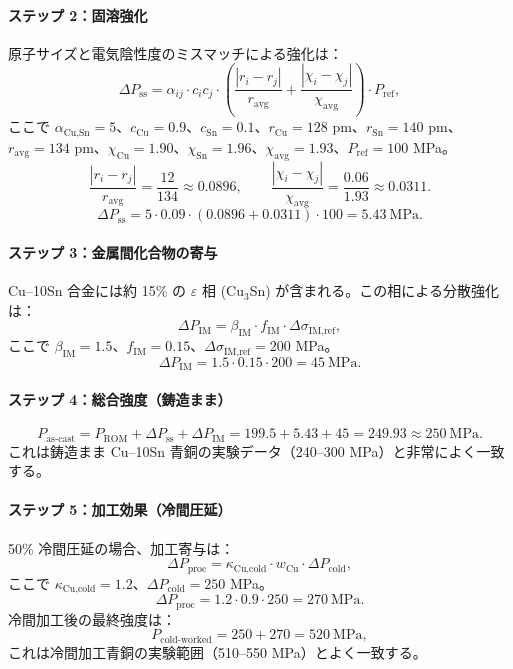 \documentclass[11pt,a4paper]{article}
\theoremstyle{remark}
\begin{document}
	\paragraph{ステップ 2：固溶強化}
	原子サイズと電気陰性度のミスマッチによる強化は：
	\[
	\Delta P_{\text{ss}} = \alpha_{ij} \cdot c_i c_j \cdot \left( \frac{|r_i - r_j|}{r_{\text{avg}}} + \frac{|\chi_i - \chi_j|}{\chi_{\text{avg}}} \right) \cdot P_{\text{ref}},
	\]
	ここで \(\alpha_{\text{Cu,Sn}} = 5\)、\(c_{\text{Cu}}=0.9\)、\(c_{\text{Sn}}=0.1\)、\(r_{\text{Cu}}=128\) pm、\(r_{\text{Sn}}=140\) pm、\(r_{\text{avg}}=134\) pm、\(\chi_{\text{Cu}}=1.90\)、\(\chi_{\text{Sn}}=1.96\)、\(\chi_{\text{avg}}=1.93\)、\(P_{\text{ref}} = 100\) MPa。
	\[
	\frac{|r_i - r_j|}{r_{\text{avg}}} = \frac{12}{134} \approx 0.0896, \qquad
	\frac{|\chi_i - \chi_j|}{\chi_{\text{avg}}} = \frac{0.06}{1.93} \approx 0.0311.
	\]
	\[
	\Delta P_{\text{ss}} = 5 \cdot 0.09 \cdot (0.0896 + 0.0311) \cdot 100 = 5.43\ \text{MPa}.
	\]
	
	\paragraph{ステップ 3：金属間化合物の寄与}
	Cu–10Sn 合金には約 15\% の \(\varepsilon\) 相 (Cu\(_3\)Sn) が含まれる。この相による分散強化は：
	\[
	\Delta P_{\text{IM}} = \beta_{\text{IM}} \cdot f_{\text{IM}} \cdot \Delta \sigma_{\text{IM,ref}},
	\]
	ここで \(\beta_{\text{IM}} = 1.5\)、\(f_{\text{IM}} = 0.15\)、\(\Delta \sigma_{\text{IM,ref}} = 200\) MPa。
	\[
	\Delta P_{\text{IM}} = 1.5 \cdot 0.15 \cdot 200 = 45\ \text{MPa}.
	\]
	
	\paragraph{ステップ 4：総合強度（鋳造まま）}
	\[
	P_{\text{as-cast}} = P_{\text{ROM}} + \Delta P_{\text{ss}} + \Delta P_{\text{IM}} = 199.5 + 5.43 + 45 = 249.93 \approx 250\ \text{MPa}.
	\]
	これは鋳造まま Cu–10Sn 青銅の実験データ（240–300 MPa）と非常によく一致する。
	
	\paragraph{ステップ 5：加工効果（冷間圧延）}
	50\% 冷間圧延の場合、加工寄与は：
	\[
	\Delta P_{\text{proc}} = \kappa_{\text{Cu,cold}} \cdot w_{\text{Cu}} \cdot \Delta P_{\text{cold}},
	\]
	ここで \(\kappa_{\text{Cu,cold}} = 1.2\)、\(\Delta P_{\text{cold}} = 250\) MPa。
	\[
	\Delta P_{\text{proc}} = 1.2 \cdot 0.9 \cdot 250 = 270\ \text{MPa}.
	\]
	冷間加工後の最終強度は：
	\[
	P_{\text{cold-worked}} = 250 + 270 = 520\ \text{MPa},
	\]
	これは冷間加工青銅の実験範囲（510–550 MPa）とよく一致する。
	
\end{document}
